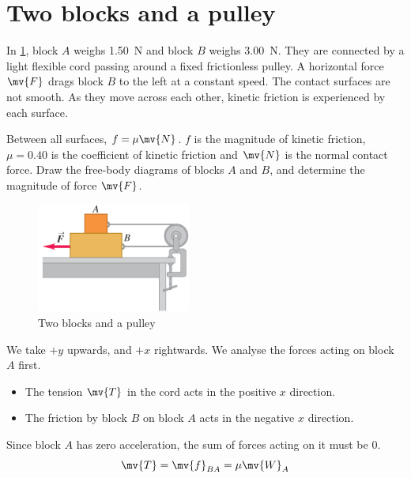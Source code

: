 \section{Two blocks and a pulley}
\begin{problem}
  In \cref{fig:twoblocks}, block \(A\) weighs \qty{1.50}{\newton} and
  block \(B\) weighs
  \qty{3.00}{\newton}. They are connected by a light flexible cord
  passing around a
  fixed frictionless pulley. A horizontal force \(\mv{F}\) drags block
  \(B\) to the left at a constant speed. The contact surfaces are not smooth. As
  they move across each other, kinetic friction is experienced by each surface.

  Between all surfaces, \(f = \mu\mv{N}\). \(f\) is the magnitude
  of kinetic friction, \(\mu=\num{0.40}\) is the coefficient of kinetic friction
  and \(\mv{N}\) is the normal contact force. Draw the free-body
  diagrams of blocks \(A\)
  and \(B\), and determine the magnitude of force \(\mv{F}\).
\end{problem}
\begin{figure}
  \centering
  \includegraphics[width=0.45\textwidth]{assets/twoblocks.png}
  \caption{Two blocks and a pulley}
  \label{fig:twoblocks}
\end{figure}
We take \(+y\) upwards, and \(+x\) rightwards.
We analyse the forces acting on block \(A\) first.
\begin{itemize}
  \item The tension \(\mv{T}\) in the cord acts in the positive \(x\) direction.
  \item The friction by block \(B\) on block \(A\) acts in the
    negative \(x\) direction.
\end{itemize}
Since block \(A\) has zero acceleration, the sum of forces acting on
it must be \(0\).
\begin{equation}
  \mv{T} = \mv{f}_{BA} = \mu \mv{W}_A
  \label{eq:fbdA}
\end{equation}

